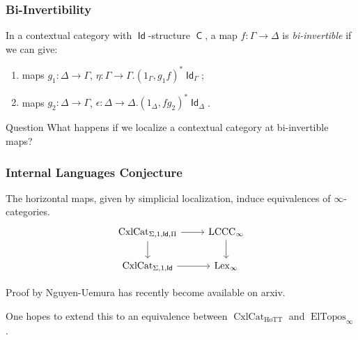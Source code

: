 \documentclass{beamer}
\DeclareMathOperator{\Id}{\mathsf{Id}}
\DeclareMathOperator{\sfC}{\mathsf{C}}
\DeclareMathOperator{\cxl}{CxlCat}
\DeclareMathOperator{\HoTT}{HoTT}
\DeclareMathOperator{\ElTopos}{ElTopos}
\DeclareMathOperator{\lexi}{Lex_\infty}
\DeclareMathOperator{\lccci}{LCCC_\infty}
\begin{document}
\begin{frame}
  \frametitle{Bi-Invertibility}

  \begin{defn}
    In a contextual category with $\Id$-structure $\sfC$, a map
    $f\colon\Gamma\rightarrow\Delta$ is
    \emph{bi-invertible} if we can give:
    \begin{enumerate}
      \item maps $g_1\colon\Delta\rightarrow\Gamma$,
        $\eta\colon\Gamma\rightarrow\Gamma.(1_\Gamma,g_1f)^*\Id_\Gamma$;
      \item maps $g_2\colon\Delta\rightarrow\Gamma$,
        $\epsilon\colon\Delta\rightarrow\Delta.(1_\Delta,fg_2)^*\Id_\Delta$.
    \end{enumerate}
  \end{defn}

  \begin{block}{Question}
    What happens if we localize a contextual category at bi-invertible
    maps?
  \end{block}
\end{frame}

\begin{frame}
  \frametitle{Internal Languages Conjecture}

  \begin{conj}
    The horizontal maps, given by simplicial localization, induce
    equivalences of $\infty$-categories.
    \[\begin{tikzcd}[ampersand replacement=\&]
      {\cxl_{\Sigma,1,\Id,\Pi}} \& {\lccci} \\
      {\cxl_{\Sigma,1,\Id}} \& {\lexi}
      \arrow[from=1-1, to=2-1]
      \arrow[from=1-2, to=2-2]
      \arrow[from=2-1, to=2-2]
      \arrow[from=1-1, to=1-2]
    \end{tikzcd}\]
  \end{conj}

  Proof by Nguyen-Uemura has recently become available on arxiv.

  One hopes to extend this to an equivalence between $\cxl_{\HoTT}$ and
  $\ElTopos_\infty$.
\end{frame}
\end{document}
